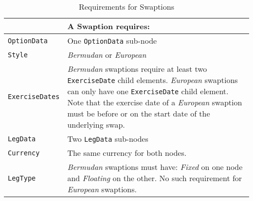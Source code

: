 \begin{table}[H]
\centering
\begin{tabu} to 0.9\linewidth {| X[-1.5,l,m] | X[-5,l,m] |}
    \hline
        & \bfseries{A  Swaption requires:} \\  \hline
    \lstinline!OptionData! & One \lstinline!OptionData! sub-node  \\  \hline
   \lstinline!Style! &  \emph{Bermudan} or \emph{European}\\ \hline
    \lstinline!ExerciseDates! & \emph{Bermudan} swaptions  require at least two \lstinline!ExerciseDate! child elements.  \emph{European} swaptions can only have one \lstinline!ExerciseDate! child element. Note that the exercise date of a \emph{European} swaption must be before or on the start date of the underlying swap. \\ \hline
    \lstinline!LegData! &  Two \lstinline!LegData! sub-nodes \\ \hline 
    \lstinline!Currency! & The same currency for both nodes.\\ \hline 
    \lstinline!LegType! & \emph{Bermudan} swaptions must have: \emph{Fixed} on one node and \emph{Floating} on the other.  No such requirement for \emph{European} swaptions.     \\ \hline   
  \end{tabu}
  \caption{Requirements for Swaptions}
  \label{tab:swaption_requirements}
\end{table}

